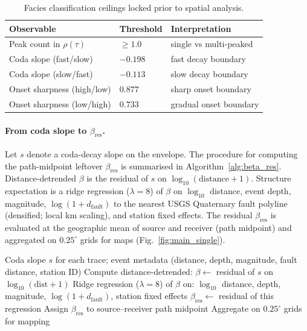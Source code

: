 \documentclass[twocolumn, 10pt]{article}
\begin{document}
\begin{table}[htbp]
\centering
\small
\caption{Facies classification ceilings locked prior to spatial analysis.}
\label{tab:facies_ceilings}
\begin{tabular}{p{3.5cm} p{1cm} p{2.9cm}}
\toprule
Observable & Threshold & Interpretation \\
\midrule
Peak count in $\rho(\tau)$ & $\ge 1.0$ & single vs multi-peaked \\
Coda slope (fast/slow) & $-0.198$ & fast decay boundary \\
Coda slope (slow/fast) & $-0.113$ & slow decay boundary \\
Onset sharpness (high/low) & $0.877$ & sharp onset boundary \\
Onset sharpness (low/high) & $0.733$ & gradual onset boundary \\
\bottomrule
\end{tabular}
\end{table}

\paragraph{From coda slope to \(\beta_{\mathrm{res}}\).}
Let \(s\) denote a coda-decay slope on the envelope. The procedure for computing the path-midpoint leftover \(\beta_{\mathrm{res}}\) is summarised in Algorithm~\ref{alg:beta_res}. Distance-detrended \(\beta\) is the residual of \(s\) on \(\log_{10}(\mathrm{distance}+1)\). Structure expectation is a ridge regression (\(\lambda=8\)) of \(\beta\) on \(\log_{10}\) distance, event depth, magnitude, \(\log(1+d_{\mathrm{fault}})\) to the nearest USGS Quaternary fault polyline (densified; local km scaling), and station fixed effects. The residual \(\beta_{\mathrm{res}}\) is evaluated at the geographic mean of source and receiver (path midpoint) and aggregated on \(0.25^\circ\) grids for maps (Fig.~\ref{fig:main_single}).

\begin{algorithm}[htbp]
\caption{Computing path-midpoint leftover $\beta_{\mathrm{res}}$}
\label{alg:beta_res}
\begin{algorithmic}[1]
\REQUIRE Coda slope $s$ for each trace; event metadata (distance, depth, magnitude, fault distance, station ID)
\STATE Compute distance-detrended: $\beta \gets$ residual of $s$ on $\log_{10}(\text{dist}+1)$
\STATE Ridge regression ($\lambda=8$) of $\beta$ on:
\STATE \quad $\log_{10}$ distance, depth, magnitude, $\log(1+d_{\text{fault}})$, station fixed effects
\STATE $\beta_{\mathrm{res}} \gets$ residual of this regression
\STATE Assign $\beta_{\mathrm{res}}$ to source--receiver path midpoint
\STATE Aggregate on $0.25^\circ$ grids for mapping
\end{algorithmic}
\end{algorithm}
\end{document}
